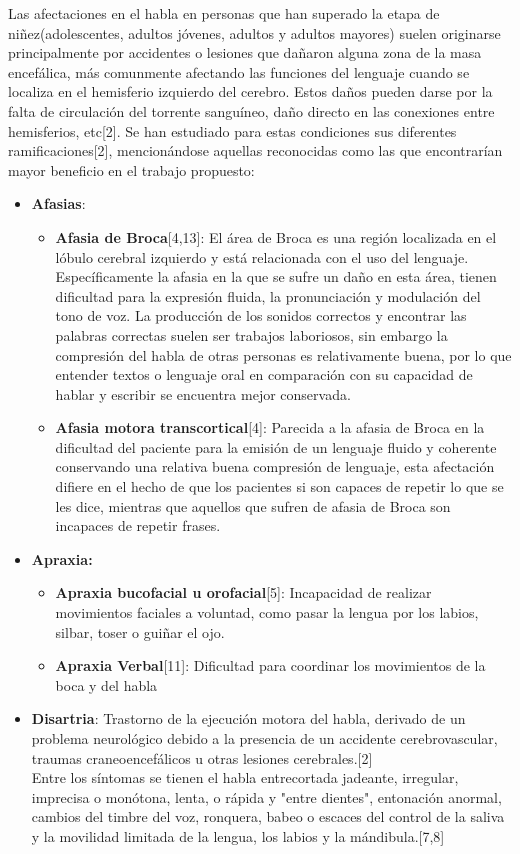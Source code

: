 \hfill \break
\justifying
Las afectaciones en el habla en personas que han superado la etapa de niñez(adolescentes, adultos jóvenes, adultos y adultos mayores) suelen originarse principalmente por accidentes o lesiones que dañaron alguna zona de la masa encefálica, más comunmente afectando las funciones del lenguaje cuando se localiza en el hemisferio izquierdo del cerebro. Estos daños pueden darse por la falta de circulación del torrente sanguíneo, daño directo en las conexiones entre hemisferios, etc[2]. Se han estudiado para estas condiciones sus diferentes ramificaciones[2], mencionándose aquellas reconocidas como las que encontrarían mayor beneficio en el trabajo propuesto:
\begin{itemize}
	\item \textbf{Afasias}:
		\begin{itemize}
			\item \textbf{Afasia de Broca}[4,13]: El área de Broca es una región localizada en el lóbulo cerebral izquierdo y está relacionada con el uso del lenguaje. Específicamente la afasia en la que se sufre un daño en esta área, tienen dificultad para la expresión fluida, la pronunciación y modulación del tono de voz. La producción de los sonidos correctos y encontrar las palabras correctas suelen ser trabajos laboriosos, sin embargo la compresión del habla de otras personas es relativamente buena, por lo que entender textos o lenguaje oral en comparación con su capacidad de hablar y escribir se encuentra mejor conservada.
			\item \textbf{Afasia motora transcortical}[4]: Parecida a la afasia de Broca en la dificultad del paciente para la emisión de un lenguaje fluido y coherente conservando una relativa buena compresión de lenguaje, esta afectación difiere en el hecho de que los pacientes si son capaces de repetir lo que se les dice, mientras que aquellos que sufren de afasia de Broca son incapaces de repetir frases.
		\end{itemize}
	\item \textbf{Apraxia:}
	\begin{itemize}
		\item \textbf{Apraxia bucofacial u orofacial}[5]: Incapacidad de realizar movimientos faciales a voluntad, como pasar la lengua por los labios, silbar, toser o guiñar el ojo.
		\item \textbf{Apraxia Verbal}[11]: Dificultad para coordinar los movimientos de la boca y del habla
	\end{itemize}
	\item \textbf{Disartria}: Trastorno de la ejecución motora del habla, derivado de un problema neurológico debido a la presencia de un accidente cerebrovascular, traumas craneoencefálicos u otras lesiones cerebrales.[2] \\ Entre los síntomas se tienen el habla entrecortada jadeante, irregular, imprecisa o monótona, lenta, o rápida y "entre dientes", entonación anormal, cambios del timbre del voz, ronquera, babeo o escaces del control de la saliva y la movilidad limitada de la lengua, los labios y la mándibula.[7,8]
\end{itemize}

